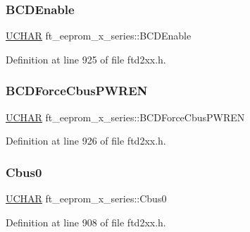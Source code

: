\subsubsection{\texorpdfstring{B\+C\+D\+Enable}{BCDEnable}}
{\footnotesize\ttfamily \hyperlink{CatCaloProto40MHz_2inc_2WinTypes_8h_a4f4bb67531a9bf6f0b9c6ad76aeba587}{U\+C\+H\+AR} ft\+\_\+eeprom\+\_\+x\+\_\+series\+::\+B\+C\+D\+Enable}



Definition at line 925 of file ftd2xx.\+h.

\mbox{\label{structft__eeprom__x__series_ad8b6a67ca67de8dd7c892d2758bd1bba}} 
\subsubsection{\texorpdfstring{B\+C\+D\+Force\+Cbus\+P\+W\+R\+EN}{BCDForceCbusPWREN}}
{\footnotesize\ttfamily \hyperlink{CatCaloProto40MHz_2inc_2WinTypes_8h_a4f4bb67531a9bf6f0b9c6ad76aeba587}{U\+C\+H\+AR} ft\+\_\+eeprom\+\_\+x\+\_\+series\+::\+B\+C\+D\+Force\+Cbus\+P\+W\+R\+EN}



Definition at line 926 of file ftd2xx.\+h.

\mbox{\label{structft__eeprom__x__series_a8204c3cd3a8d8ea0f1461217fdc7ce83}} 
\subsubsection{\texorpdfstring{Cbus0}{Cbus0}}
{\footnotesize\ttfamily \hyperlink{CatCaloProto40MHz_2inc_2WinTypes_8h_a4f4bb67531a9bf6f0b9c6ad76aeba587}{U\+C\+H\+AR} ft\+\_\+eeprom\+\_\+x\+\_\+series\+::\+Cbus0}



Definition at line 908 of file ftd2xx.\+h.

\mbox{\label{structft__eeprom__x__series_ac2cfe6ac98141e7f3552a3884304a6b3}} 
